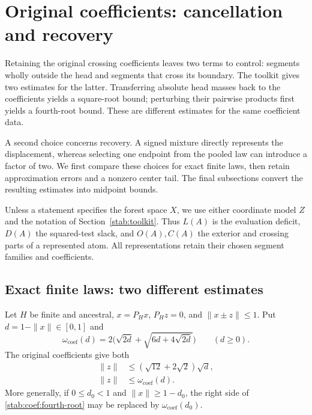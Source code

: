\section{Original coefficients: cancellation and recovery}
\label{stab:coef:section}

Retaining the original crossing coefficients leaves two terms to
control: segments wholly outside the head and segments that cross its
boundary. The toolkit gives two estimates for the latter. Transferring
absolute head masses back to the coefficients yields a square-root
bound; perturbing their pairwise products first yields a fourth-root
bound. These are different estimates for the same coefficient data.

A second choice concerns recovery. A signed mixture directly represents
the displacement, whereas selecting one endpoint from the pooled law
can introduce a factor of two. We first compare these choices for exact
finite laws, then retain approximation errors and a nonzero center tail.
The final subsections convert the resulting estimates into midpoint
bounds.

Unless a statement specifies the forest space $X$, we use either
coordinate model $Z$ and the notation of Section~\ref{stab:toolkit}.
Thus $L(A)$ is the evaluation deficit, $D(A)$ the squared-test slack,
and $O(A),C(A)$ the exterior and crossing parts of a represented atom.
All representations retain their chosen segment families and coefficients.

\subsection{Exact finite laws: two different estimates}
\label{stab:coef:exact}

\begin{proposition}\label{stab:coef:exact-tail}
Let $H$ be finite and ancestral, $x=P_Hx$, $P_Hz=0$, and
$\|x\pm z\|\le1$. Put $d=1-\|x\|\in[0,1]$ and
\[
 \omega_{\mathrm{coef}}(d)=2\bigl(\sqrt{2d}+\sqrt{6d+4\sqrt{2d}}\bigr)
 \qquad(d\ge0).
\]
The original coefficients give both
\begin{align}
 \|z\|&\le(\sqrt{12}+2\sqrt2)\sqrt d,
        \label{stab:coef:square-root}\\
 \|z\|&\le\omega_{\mathrm{coef}}(d).
        \label{stab:coef:fourth-root}
\end{align}
More generally, if $0\le d_0<1$ and $\|x\|\ge1-d_0$, the
right side of \eqref{stab:coef:fourth-root} may be replaced by
$\omega_{\mathrm{coef}}(d_0)$.
\end{proposition}

